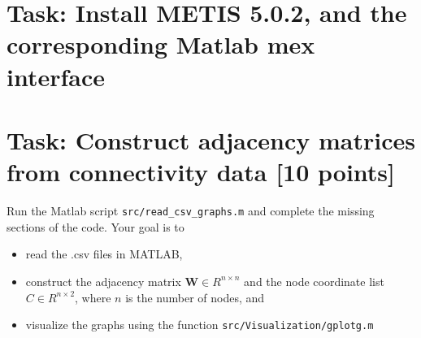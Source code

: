 \documentclass[unicode,11pt,a4paper,oneside,numbers=endperiod,openany]{scrartcl}
\begin{document}
\setassignment
{}

\newline

\assignmentpolicy



\section{Task: Install METIS 5.0.2, and the corresponding Matlab mex interface}



\section{Task:  Construct adjacency matrices
from connectivity data [10 points]}


Run the Matlab script
\texttt{src/read\_csv\_graphs.m} and complete
the
missing sections of the code. Your goal is to
\begin{itemize}
    \item read the .csv files in MATLAB,
    \item construct the adjacency matrix
    $\mathbf{W} \in R^{n\times n}$ and
    the node coordinate list $C \in
    R^{n\times 2}$, where $n$ is the number of nodes, and 
    \item visualize the graphs using the
    function
    \texttt{src/Visualization/gplotg.m}
\end{itemize}

\end{document}
